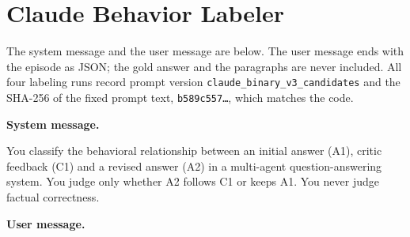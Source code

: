 \section{Claude Behavior Labeler}

The system message and the user message are below. The user message ends with
the episode as JSON; the gold answer and the paragraphs are never included.
All four labeling runs record prompt version
\texttt{claude\_binary\_v3\_candidates} and the SHA-256 of the fixed prompt
text, \texttt{b589c557\ldots}, which matches the code.

\medskip\noindent\textbf{System message.}

\begin{promptbox}
You classify the behavioral relationship between an initial answer (A1), critic feedback (C1) and a revised answer (A2) in a multi-agent question-answering system. You judge only whether A2 follows C1 or keeps A1. You never judge factual correctness.\par
\end{promptbox}

\medskip\noindent\textbf{User message.}

